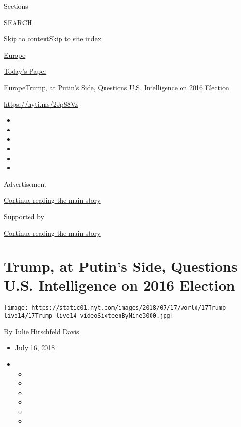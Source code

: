 Sections

SEARCH

\protect\hyperlink{site-content}{Skip to
content}\protect\hyperlink{site-index}{Skip to site index}

\href{https://www.nytimes.com/section/world/europe}{Europe}

\href{https://myaccount.nytimes.com/auth/login?response_type=cookie\&client_id=vi}{}

\href{https://www.nytimes.com/section/todayspaper}{Today's Paper}

\href{/section/world/europe}{Europe}\textbar{}Trump, at Putin's Side,
Questions U.S. Intelligence on 2016 Election

\href{https://nyti.ms/2Jp88Vz}{https://nyti.ms/2Jp88Vz}

\begin{itemize}
\item
\item
\item
\item
\item
\item
\end{itemize}

Advertisement

\protect\hyperlink{after-top}{Continue reading the main story}

Supported by

\protect\hyperlink{after-sponsor}{Continue reading the main story}

\hypertarget{trump-at-putins-side-questions-us-intelligence-on-2016-election}{%
\section{Trump, at Putin's Side, Questions U.S. Intelligence on 2016
Election}\label{trump-at-putins-side-questions-us-intelligence-on-2016-election}}

\texttt{[image: https://static01.nyt.com/images/2018/07/17/world/17Trump-live14/17Trump-live14-videoSixteenByNine3000.jpg]}

By \href{https://www.nytimes.com/by/julie-hirschfeld-davis}{Julie
Hirschfeld Davis}

\begin{itemize}
\item
  July 16, 2018
\item
  \begin{itemize}
  \item
  \item
  \item
  \item
  \item
  \item
  \end{itemize}
\end{itemize}

